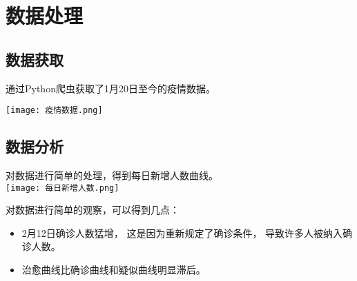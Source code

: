 \section{数据处理}
\subsection{数据获取}
通过Python爬虫获取了1月20日至今的疫情数据。
\par
\texttt{[image: 疫情数据.png]}
\subsection{数据分析}
对数据进行简单的处理，得到每日新增人数曲线。\\
\texttt{[image: 每日新增人数.png]}
\par
对数据进行简单的观察，可以得到几点：
\begin{itemize}
    \item
          2月12日确诊人数猛增，
          这是因为重新规定了确诊条件，
          导致许多人被纳入确诊人数。
    \item
          治愈曲线比确诊曲线和疑似曲线明显滞后。
\end{itemize}
